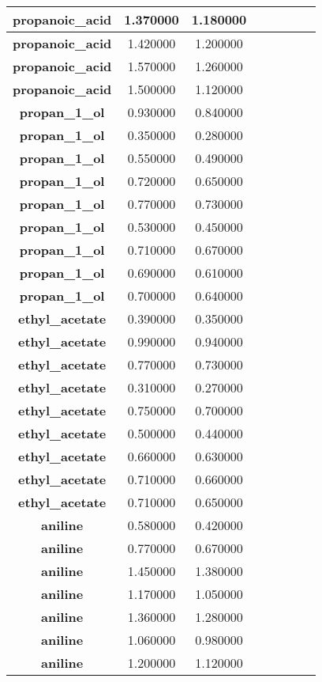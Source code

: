 \documentclass{amsart}
\begin{document}
\begin{center}
\begin{tabular}{c|c|c|c|c|c|c|c}
\textbf{propanoic\_acid}&1.370000&1.180000 \\ \hline 
\textbf{propanoic\_acid}&1.420000&1.200000 \\ \hline 
\textbf{propanoic\_acid}&1.570000&1.260000 \\ \hline 
\textbf{propanoic\_acid}&1.500000&1.120000 \\ \hline 
\textbf{propan\_1\_ol}&0.930000&0.840000 \\ \hline 
\textbf{propan\_1\_ol}&0.350000&0.280000 \\ \hline 
\textbf{propan\_1\_ol}&0.550000&0.490000 \\ \hline 
\textbf{propan\_1\_ol}&0.720000&0.650000 \\ \hline 
\textbf{propan\_1\_ol}&0.770000&0.730000 \\ \hline 
\textbf{propan\_1\_ol}&0.530000&0.450000 \\ \hline 
\textbf{propan\_1\_ol}&0.710000&0.670000 \\ \hline 
\textbf{propan\_1\_ol}&0.690000&0.610000 \\ \hline 
\textbf{propan\_1\_ol}&0.700000&0.640000 \\ \hline 
\textbf{ethyl\_acetate}&0.390000&0.350000 \\ \hline 
\textbf{ethyl\_acetate}&0.990000&0.940000 \\ \hline 
\textbf{ethyl\_acetate}&0.770000&0.730000 \\ \hline 
\textbf{ethyl\_acetate}&0.310000&0.270000 \\ \hline 
\textbf{ethyl\_acetate}&0.750000&0.700000 \\ \hline 
\textbf{ethyl\_acetate}&0.500000&0.440000 \\ \hline 
\textbf{ethyl\_acetate}&0.660000&0.630000 \\ \hline 
\textbf{ethyl\_acetate}&0.710000&0.660000 \\ \hline 
\textbf{ethyl\_acetate}&0.710000&0.650000 \\ \hline 
\textbf{aniline}&0.580000&0.420000 \\ \hline 
\textbf{aniline}&0.770000&0.670000 \\ \hline 
\textbf{aniline}&1.450000&1.380000 \\ \hline 
\textbf{aniline}&1.170000&1.050000 \\ \hline 
\textbf{aniline}&1.360000&1.280000 \\ \hline 
\textbf{aniline}&1.060000&0.980000 \\ \hline 
\textbf{aniline}&1.200000&1.120000 \\ \hline 

\end{tabular}
\end{center}
\end{document}
